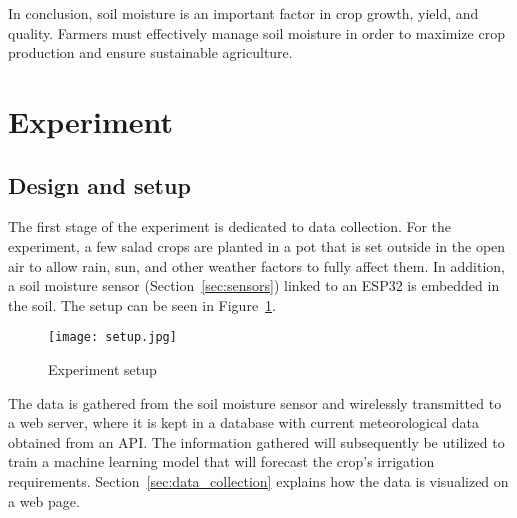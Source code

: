 \documentclass[11pt]{scrartcl} %
\begin{document}
\newline In conclusion, soil moisture is an important factor in crop growth, yield, and quality. Farmers must effectively manage soil moisture in order to maximize crop production and ensure sustainable agriculture.


\section{Experiment}
\subsection{Design and setup}
The first stage of the experiment is dedicated to data collection. For the experiment, a few salad crops are planted in a pot that is set outside in the open air to allow rain, sun, and other weather factors to fully affect them. In addition, a soil moisture sensor (Section~\ref{sec:sensors}) linked to an ESP32 is embedded in the soil. The setup can be seen in Figure~\ref{fig:experiment_setup}.
\begin{figure}[h]
	\centering
	\texttt{[image: setup.jpg]}
	\caption{Experiment setup}
	\label{fig:experiment_setup}
\end{figure}
The data is gathered from the soil moisture sensor and wirelessly transmitted to a web server, where it is kept in a database with current meteorological data obtained from an API. The information gathered will subsequently be utilized to train a machine learning model that will forecast the crop's irrigation requirements. Section~\ref{sec:data_collection} explains how the data is visualized on a web page.
\end{document}
